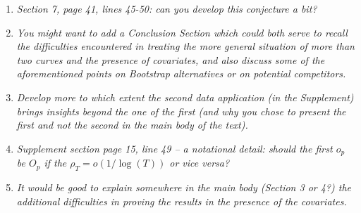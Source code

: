 \documentclass[a4paper,12pt]{article}
\begin{document}
\begin{enumerate}[label=\arabic*.,leftmargin=0.6cm]
\item \textit{Section 7, page 41, lines 45-50: can you develop this conjecture a bit?}


\item \textit{You might want to add a Conclusion Section which could both serve to recall the difficulties encountered in treating the more general situation of more than two curves and the presence of
covariates, and also discuss some of the aforementioned points on Bootstrap alternatives or on potential competitors.}  


\item \textit{Develop more to which extent the second data application (in the Supplement) brings insights beyond the one of the first (and why you chose to present the first and not the second in the main body of the text).}


\item \textit{Supplement section page 15, line 49 -- a notational detail: should the first $o_p$ be $O_p$ if the $\rho_T = o(1/ \log(T))$ or vice versa?}  


\item \textit{It would be good to explain somewhere in the main body (Section 3 or 4?) the additional difficulties in proving the results in the presence of the covariates.}
  
  
\end{enumerate}


\vspace{10pt}

{\small
\setlength{\bibsep}{0.55em}
}
\end{document}
